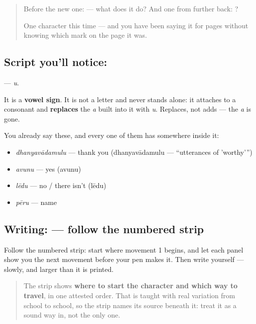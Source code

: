\begin{quote}
Before the new one:  — what does it do? And one from further back: ?

One character this time — and you have been saying it for pages without knowing which mark on the page it was.
\end{quote}

\subsection*{Script you'll notice: }
\textbf{} — \emph{u}.

It is a \textbf{vowel sign}. It is not a letter and never stands alone: it attaches to a consonant and \textbf{replaces} the \emph{a} built into it with \emph{u}. Replaces, not adds — the \emph{a} is gone.

You already say these, and every one of them has  somewhere inside it:

\begin{itemize}
\raggedright
  \item \textbf{} \emph{dhanyavādamulu} — thank you (dhanyavādamulu — \textquotedblleft{}utterances of 'worthy'\textquotedblright{})
  \item \textbf{} \emph{avunu} — yes (avunu)
  \item \textbf{} \emph{lēdu} — no / there isn't (lēdu)
  \item \textbf{} \emph{pēru} — name
\end{itemize}

\subsection*{Writing:  — follow the numbered strip}

Follow the numbered strip: start where movement 1 begins, and let each panel show you the next movement before your pen makes it. Then write  yourself — slowly, and larger than it is printed.

\begin{quote}
The strip shows \textbf{where to start the character and which way to travel}, in one attested order. That is taught with real variation from school to school, so the strip names its source beneath it: treat it as a sound way in, not the only one.
\end{quote}

